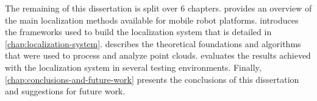 The remaining of this dissertation is split over 6 chapters.  provides an overview of the main localization methods available for mobile robot platforms.  introduces the frameworks used to build the localization system that is detailed in \cref{chap:localization-system}.  describes the theoretical foundations and algorithms that were used to process and analyze point clouds.  evaluates the results achieved with the localization system in several testing environments. Finally, \cref{chap:conclusions-and-future-work} presents the conclusions of this dissertation and suggestions for future work.
